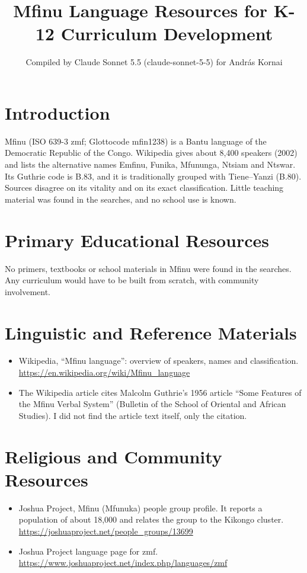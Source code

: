 \documentclass[12pt]{article}
\title{Mfinu Language Resources for K-12 Curriculum Development}
\author{Compiled by Claude Sonnet 5.5 (claude-sonnet-5-5) for Andr\'as Kornai}
\date{}
\begin{document}
\maketitle

\section{Introduction}
Mfinu (ISO 639-3 zmf; Glottocode mfin1238) is a Bantu language of the Democratic Republic of the Congo. Wikipedia gives about 8,400 speakers (2002) and lists the alternative names Emfinu, Funika, Mfununga, Ntsiam and Ntswar. Its Guthrie code is B.83, and it is traditionally grouped with Tiene--Yanzi (B.80). Sources disagree on its vitality and on its exact classification. Little teaching material was found in the searches, and no school use is known.

\section{Primary Educational Resources}
No primers, textbooks or school materials in Mfinu were found in the searches. Any curriculum would have to be built from scratch, with community involvement.

\section{Linguistic and Reference Materials}
\begin{itemize}
\item Wikipedia, ``Mfinu language'': overview of speakers, names and classification. \url{https://en.wikipedia.org/wiki/Mfinu_language}
\item The Wikipedia article cites Malcolm Guthrie's 1956 article ``Some Features of the Mfinu Verbal System'' (Bulletin of the School of Oriental and African Studies). I did not find the article text itself, only the citation.
\end{itemize}

\section{Religious and Community Resources}
\begin{itemize}
\item Joshua Project, Mfinu (Mfunuka) people group profile. It reports a population of about 18,000 and relates the group to the Kikongo cluster. \url{https://joshuaproject.net/people_groups/13699}
\item Joshua Project language page for zmf. \url{https://www.joshuaproject.net/index.php/languages/zmf}
\end{itemize}
\end{document}
